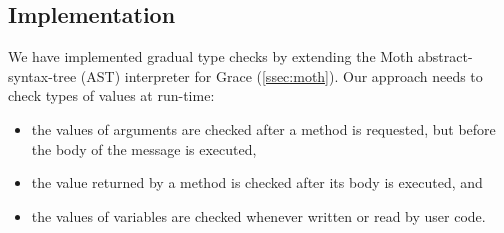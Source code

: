
\subsection{Implementation} 
\label{ssec:implementation} 


We have implemented gradual type checks 
by extending the Moth abstract-syntax-tree (AST) interpreter for
Grace (\cref{ssec:moth}).
%
%
%
%
Our approach needs to check types of values at run-time:

\begin{itemize}
\item the values of arguments are checked after a method is requested, 
      but before the body of the message is executed,
\item the value returned by a method is checked after its body is executed, and
\item the values of variables are checked
      whenever written or read by user code.
\end{itemize}


